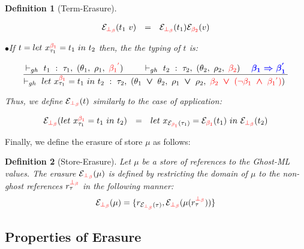 \documentclass[a4paper,11pt,oneside]{article}
\theoremstyle{plain}
\newtheorem{definition}{Definition}[subsection]
\newcommand{\rouge}[1]{\textcolor{red}{#1}}
\newcommand{\bwedge}{\boldsymbol{~\wedge~}}
\newcommand{\bvee}{\boldsymbol{~\vee~}}
\newcommand{\ghosttyping}[6]{\vdash_{gh}~#1~:~#2,~(#3,~#4,~\rouge{#5})~\textcolor{blue}{\boldsymbol{#6}}}
\newcommand{\gba}[1]{\beta_{#1}}
\newcommand{\gbb}{\bot_\beta}
\newcommand{\gbra}[1]{\textcolor{red}{\gba{#1}}}
\newcommand{\gbbr}{\textcolor{red}{\gbb}}
\newcommand{\gbran}[1]{\textcolor{red}{\neg\gba{#1}}}
\newcommand{\e}{\mathcal{E}}
\newcommand{\ebot}[1]{\e_{\gbbr}(#1)}
\newcommand{\egbra}[2]{\e_{\gbra{#1}}(#2)}
\begin{document}
\begin{definition}[Term-Erasure]
\begin{small}
\begin{adjustwidth}{-4cm}{3cm}
\begin{displaymath}
\begin{array}{llll}
\ebot{t_1~v} &=& \ebot{t_1}\egbra{2}{v}
\end{array}
\end{displaymath}
\end{adjustwidth}
\end{small}
\noindent$\bullet$\quad If $t = let~x^{\gbra{1}}_{\tau_1} = t_1~in~t_2$ then, the the typing of $t$ is:
\begin{footnotesize}
\begin{adjustwidth}{0cm}{0cm}
\begin{displaymath} 
\dfrac
	{
		\ghosttyping
			{t_1}
			{\tau_1}
			{\theta_1}
			{\rho_1}
			{\gbra{1}^{\rouge{'}}}
			{} \qquad
		\ghosttyping
			{t_2}
			{\tau_2}
			{\theta_2}
			{\rho_2}
			{\gbra{2}}
			{\quad \gba{1} \Rightarrow \gba{1}^{'}}
	}
	{\ghosttyping
		{let~x^{\gbra{1}}_{\tau_1} = t_1~in~t_2}
		{\tau_2}
		{\theta_1 \bvee \theta_2}
		{\rho_1 \bvee \rho_2}
		{\gbra{2} \bvee (\gbran{1} \bwedge \gbra{1}^{\rouge{'}})}
		{}}
\end{displaymath}
\end{adjustwidth}
\end{footnotesize}
Thus, we define $\ebot{t}$ similarly to the case of application:
\begin{small}
\begin{adjustwidth}{-3cm}{0cm}
\begin{displaymath} 
\begin{array}{llll}
\ebot{let~x^{\gbra{1}}_{\tau_1} = t_1~in~t_2} &=& 
let~x_{\egbra{1}{\tau_1}} = \egbra{1}{t_1}~in~\ebot{t_2} 
\end{array}
\end{displaymath}
\end{adjustwidth}
\end{small}
\end{definition}

Finally, we define the erasure of store $\mu$ as follows:
\begin{definition}[Store-Erasure]
Let $\mu$ be a store of references to the Ghost-ML values. 
The erasure $\ebot{\mu}$ is defined by restricting the domain of $\mu$ to the non-ghost references $r^{\gbbr}_{\tau}$ in the following manner:
$$ \ebot{\mu} = \lbrace r_{\ebot{\tau}}, \ebot{\mu(r^{\gbbr}_{\tau})} \rbrace $$
\label{sem-erasure}
\hypertarget{sem-erasure}{}
\end{definition}



\subsection{Properties of Erasure}
\end{document}
